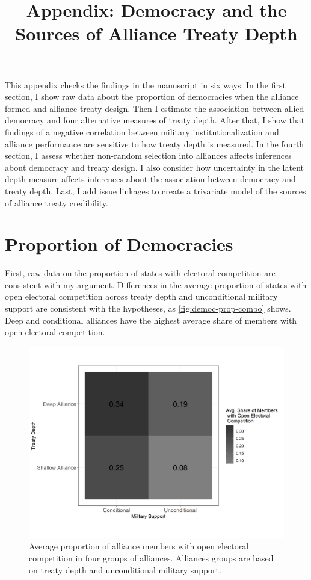 \documentclass[12pt]{article}
\title{\textbf{Appendix: Democracy and the Sources of Alliance Treaty Depth}}
\author{}
\date{}
\begin{document}
\maketitle 

\doublespace 

This appendix checks the findings in the manuscript in six ways. 
In the first section, I show raw data about the proportion of democracies when the alliance formed and alliance treaty design.
Then I estimate the association between allied democracy and four alternative measures of treaty depth.
After that, I show that findings of a negative correlation between military institutionalization and alliance performance are sensitive to how treaty depth is measured. 
In the fourth section, I assess whether non-random selection into alliances affects inferences about democracy and treaty design.   
I also consider how uncertainty in the latent depth measure affects inferences about the association between democracy and treaty depth. 
Last, I add issue linkages to create a trivariate model of the sources of alliance treaty credibility. 


\section{Proportion of Democracies}


First, raw data on the proportion of states with electoral competition are consistent with my argument. 
Differences in the average proportion of states with open electoral competition across treaty depth and unconditional military support are consistent with the hypotheses, as \autoref{fig:democ-prop-combo} shows.
Deep and conditional alliances have the highest average share of members with open electoral competition.


\begin{figure}
\includegraphics[width=.95\textwidth]{democ-prop-combo.png}  
\caption{Average proportion of alliance members with open electoral competition in four groups of alliances. Alliances groups are based on treaty depth and unconditional military support.}
\label{fig:democ-prop-combo}
\end{figure}
\end{document}
